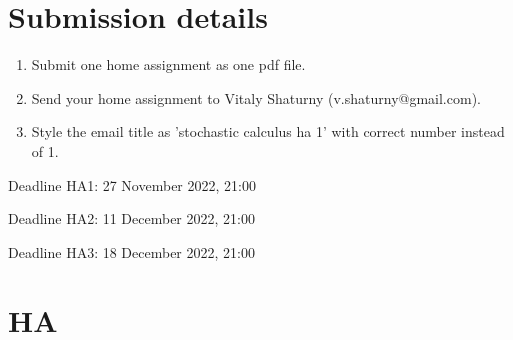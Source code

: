 \documentclass[12pt]{article}
\begin{document}
\section{Submission details}

\begin{enumerate}
  \item Submit one home assignment as one pdf file. 
  \item Send your home assignment to Vitaly Shaturny (v.shaturny@gmail.com).
  \item Style the email title as 'stochastic calculus ha 1' with correct number instead of 1. 
\end{enumerate}

Deadline HA1: 27 November 2022, 21:00

Deadline HA2: 11 December 2022, 21:00

Deadline HA3: 18 December 2022, 21:00
\newpage



\section{HA}
\end{document}
